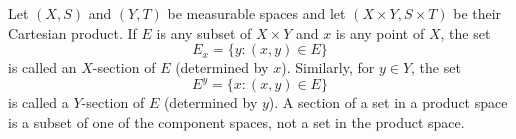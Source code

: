 Let $(X, S)$ and $(Y, T)$ be measurable spaces and let $(X \times Y, S \times T)$ be their Cartesian product. If $E$ is any subset of $X \times Y$ and $x$ is any point of $X$, the set
$$E_x = \{ y : (x, y) \in E \}$$
is called an $X$-section of $E$ (determined by $x$). Similarly, for $y \in Y$, the set
$$E^y = \{ x : (x, y) \in E \}$$
is called a $Y$-section of $E$ (determined by $y$). A section of a set in a product space is a subset of one of the component spaces, not a set in the product space.
